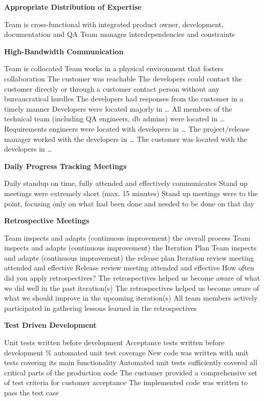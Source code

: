 \textbf{Appropriate Distribution of Expertise}
\begin{itemize}
	\taa Team is cross-functional with integrated product owner, development, documentation and QA
	\taa Team manages interdependencies and constraints
\end{itemize}

\textbf{High-Bandwidth Communication}
\begin{itemize}
	\taa Team is collocated
	\taa Team works in a physical environment that fosters collaboration
	\pam The customer was reachable
	\pam The developers could contact the customer directly or through a customer contact person without any bureaucratical hurdles 
	\pam The developers had responses from the customer in a timely manner 
	\pam Developers were located majorly in \ldots
	\pam All members of the technical team (including QA engineers, db admins) were located in \ldots
	\pam Requirements engineers were located with developers in \ldots
	\pam The project/release manager worked with the developers in \ldots
	\pam The customer was located with the developers in \ldots
\end{itemize}

\textbf{Daily Progress Tracking Meetings}
\begin{itemize}
	\taa Daily standup on time, fully attended and effectively communicates
	\pam Stand up meetings were extremely short (max. 15 minutes) 
	\pam Stand up meetings were to the point, focusing only on what had been done and needed to be done on that day 
\end{itemize}

\textbf{Retrospective Meetings}
\begin{itemize}
	\taa Team inspects and adapts (continuous improvement) the overall process
	\taa Team inspects and adapts (continuous improvement) the Iteration Plan 
	\taa Team inspects and adapts (continuous improvement) the release plan
	\taa Iteration review meeting attended and effective
	\taa Release review meeting attended and effective
	\pam How often did you apply retrospectives?
	\pam The retrospectives helped us become aware of what we did well in the past iteration(s)
	\pam The retrospectives helped us become aware of what we should improve in the upcoming iteration(s) 
	\pam All team members actively participated in gathering lessons learned in the retrospectives

\end{itemize}

\textbf{Test Driven Development}
\begin{itemize}
	\taa Unit tests written before development
	\taa Acceptance tests written before development
	\% automated unit test coverage
	\pam New code was written with unit tests covering its main functionality
	\pam Automated unit tests sufficiently covered all critical parts of the production code
	\pam The customer provided a comprehensive set of test criteria for customer acceptance
	\pam The implemented code was written to pass the test case
\end{itemize}

